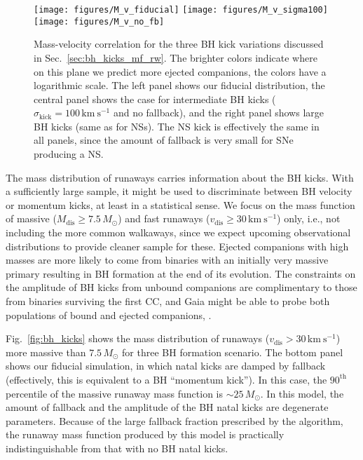 \documentclass{aa}
\DeclareRobustCommand{\Figref}[1]{Fig.~\ref{#1}}
\DeclareRobustCommand{\Secref}[1]{Sec.~\ref{#1}}
\begin{document}
\begin{figure*}[htbp]
  \centering
   \texttt{[image: figures/M\_v\_fiducial]}
   \texttt{[image: figures/M\_v\_sigma100]}
   \texttt{[image: figures/M\_v\_no\_fb]}
   \caption{Mass-velocity correlation for the three BH kick variations
     discussed in \Secref{sec:bh_kicks_mf_rw}. The brighter colors indicate
     where on this plane we predict more ejected companions, the
     colors have a logarithmic scale. The left panel shows
     our fiducial distribution, the central panel shows the case for
     intermediate BH kicks ($\sigma_\mathrm{kick}=100\,\mathrm{km\
       s^{-1}}$ and no fallback), and the right panel shows large BH
     kicks (same as for NSs). The NS kick is effectively the same in
     all panels, since the amount of fallback is very small for SNe
     producing a NS.}
   \label{fig:M_vrw}
\end{figure*}


The mass distribution of runaways carries
information about the BH kicks. With a sufficiently large sample, it might be used to
discriminate between BH velocity or momentum kicks, at least in a
statistical sense. We focus on the mass function of massive
($M_\mathrm{dis}\geq7.5\,M_\odot$) and fast runaways
($v_\mathrm{dis}\geq30\,\mathrm{km \ s^{-1}}$)
only, i.e., not including the more common walkaways, since we expect
upcoming observational distributions to provide cleaner sample for
these. Ejected companions with high masses are more likely to come from
binaries with an initially very massive primary resulting in BH
formation at the end of its evolution.
The constraints on the amplitude of BH kicks from unbound companions are
complimentary to those from binaries surviving the first CC, and Gaia
might be able to probe both populations of bound and ejected
companions, \citep[][]{breivik:17}. 

\Figref{fig:bh_kicks}
shows the mass distribution of runaways
($v_\mathrm{dis}>30\,\mathrm{km\ s^{-1}}$) more massive than $7.5\,M_\odot$ for three BH
formation scenario. The bottom panel shows our fiducial
simulation, in which natal kicks are damped by fallback (effectively,
this is equivalent to a BH ``momentum kick''). In this case, the $90^\mathrm{th}$
percentile of the massive runaway mass function is $\sim$$25\,M_\odot$.
In this model, the amount of fallback and the amplitude of the BH natal kicks
are degenerate parameters. Because of the large fallback fraction
prescribed by the \cite{fryer:12} algorithm, the runaway mass function
produced by this model is practically indistinguishable from that with
no BH natal kicks.
\end{document}

